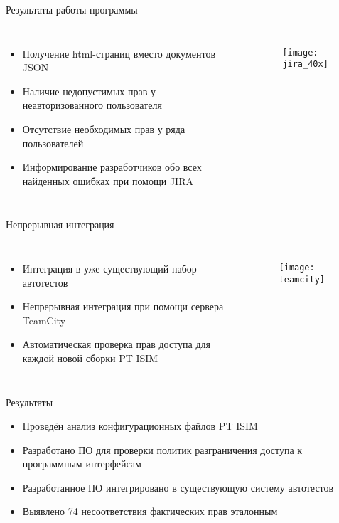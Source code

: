 \begin{frame}{Результаты работы программы}
    \begin{columns}
            \begin{itemize}
                \item Получение html-страниц вместо документов JSON
                \item Наличие недопустимых прав у неавторизованного пользователя
                \item Отсутствие необходимых прав у ряда пользователей
                \item Информирование разработчиков обо всех найденных ошибках при помощи JIRA
            \end{itemize}
            \begin{figure}[h!]
                \centering
                \texttt{[image: jira\_40x]}
                \label{img:jira_40x}
            \end{figure}
    \end{columns}
\end{frame}

\begin{frame}{Непрерывная интеграция}
    \begin{columns}
            \begin{itemize}
                \item Интеграция в уже существующий набор автотестов
                \item Непрерывная интеграция при помощи сервера TeamCity
                \item Автоматическая проверка прав доступа для каждой новой сборки PT ISIM
            \end{itemize}
            \begin{figure}[h!]
                \centering
                \texttt{[image: teamcity]}
                \label{img:teamcity}
            \end{figure}
    \end{columns}
\end{frame}

\begin{frame}{Результаты}
    \begin{itemize}
        \item Проведён анализ конфигурационных файлов PT ISIM
        \item Разработано ПО для проверки политик разграничения доступа к программным интерфейсам
        \item Разработанное ПО интегрировано в существующую систему автотестов
        \item Выявлено 74 несоответствия фактических прав эталонным
    \end{itemize}
\end{frame}

